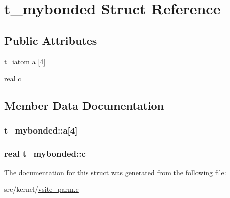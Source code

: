 \hypertarget{structt__mybonded}{\section{t\-\_\-mybonded \-Struct \-Reference}
\label{structt__mybonded}
}
\subsection*{\-Public \-Attributes}
\begin{DoxyCompactItemize}
\item 
\hyperlink{include_2types_2idef_8h_abb1c069d34f868f1fa980a4c131ba249}{t\-\_\-iatom} \hyperlink{structt__mybonded_a9ddb20ccabc3da76ba02b7e24cf4c43b}{a} \mbox{[}4\mbox{]}
\item 
real \hyperlink{structt__mybonded_a11edcff550f66098246c2b7880fc80c4}{c}
\end{DoxyCompactItemize}


\subsection{\-Member \-Data \-Documentation}
\hypertarget{structt__mybonded_a9ddb20ccabc3da76ba02b7e24cf4c43b}{
\subsubsection[{a}]{ {\bf t\-\_\-mybonded\-::a}\mbox{[}4\mbox{]}}}\label{structt__mybonded_a9ddb20ccabc3da76ba02b7e24cf4c43b}
\hypertarget{structt__mybonded_a11edcff550f66098246c2b7880fc80c4}{
\subsubsection[{c}]{\setlength{\rightskip}{0pt plus 5cm}real {\bf t\-\_\-mybonded\-::c}}}\label{structt__mybonded_a11edcff550f66098246c2b7880fc80c4}


\-The documentation for this struct was generated from the following file\-:\begin{DoxyCompactItemize}
\item 
src/kernel/\hyperlink{vsite__parm_8c}{vsite\-\_\-parm.\-c}\end{DoxyCompactItemize}
